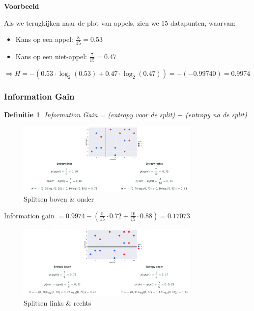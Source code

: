\documentclass{article}
\newtheorem{theorem}{Definitie}[section]
\begin{document}
\textbf{Voorbeeld}

Als we terugkijken naar de plot van appels, zien we 15 datapunten, waarvan:

\begin{itemize}
    \item Kans op een appel: $\frac{8}{15} = 0.53$
    \item Kans op een niet-appel: $\frac{7}{15} = 0.47$
\end{itemize}

$\Rightarrow H = - (0.53 \cdot \log_2 (0.53) + 0.47 \cdot \log_2(0.47)) = - (- 0.99740) = 0.9974$

\subsubsection{Information Gain}

\begin{theorem}
    Information Gain = (entropy voor de split) $-$ (entropy na de split)
\end{theorem}

\begin{figure}[H]
    \centering
    \includegraphics[width=0.8\textwidth]{information-gain.png}
    \caption{Splitsen boven \& onder}
\end{figure}

Information gain $= 0.9974 - (\frac{5}{15} \cdot 0.72 + \frac{10}{15} \cdot 0.88) = 0.17073$


\begin{figure}[H]
    \centering
    \includegraphics[width=0.8\textwidth]{information-gain2.png}
    \caption{Splitsen links \& rechts}
\end{figure}
\end{document}
